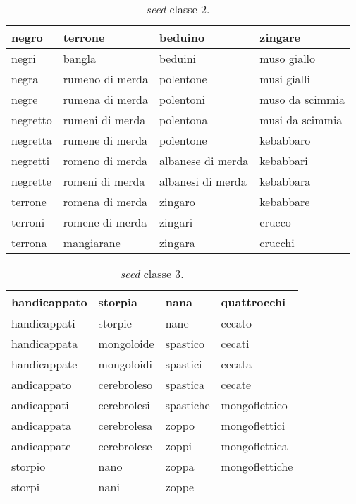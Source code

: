\begin{table}[ht]
\centering
\begin{tabular}{|l|l|l|l|}
\hline
negro    & terrone         & beduino           & zingare         \\ \hline
negri    & bangla          & beduini           & muso giallo     \\ \hline
negra    & rumeno di merda & polentone         & musi gialli     \\ \hline
negre    & rumena di merda & polentoni         & muso da scimmia \\ \hline
negretto & rumeni di merda & polentona         & musi da scimmia \\ \hline
negretta & rumene di merda & polentone         & kebabbaro       \\ \hline
negretti & romeno di merda & albanese di merda & kebabbari       \\ \hline
negrette & romeni di merda & albanesi di merda & kebabbara       \\ \hline
terrone  & romena di merda & zingaro           & kebabbare       \\ \hline
terroni  & romene di merda & zingari           & crucco          \\ \hline
terrona  & mangiarane      & zingara           & crucchi         \\ \hline
\end{tabular}
\caption{\textit{seed} classe 2.}
\end{table}

\begin{table}[ht]
\centering
\begin{tabular}{|l|l|l|l|}
\hline
handicappato & storpia     & nana      & quattrocchi    \\ \hline
handicappati & storpie     & nane      & cecato         \\ \hline
handicappata & mongoloide  & spastico  & cecati         \\ \hline
handicappate & mongoloidi  & spastici  & cecata         \\ \hline
andicappato  & cerebroleso & spastica  & cecate         \\ \hline
andicappati  & cerebrolesi & spastiche & mongoflettico  \\ \hline
andicappata  & cerebrolesa & zoppo     & mongoflettici  \\ \hline
andicappate  & cerebrolese & zoppi     & mongoflettica  \\ \hline
storpio      & nano        & zoppa     & mongoflettiche \\ \hline
storpi       & nani        & zoppe     &                \\ \hline
\end{tabular}
\caption{\textit{seed} classe 3.}
\end{table}

